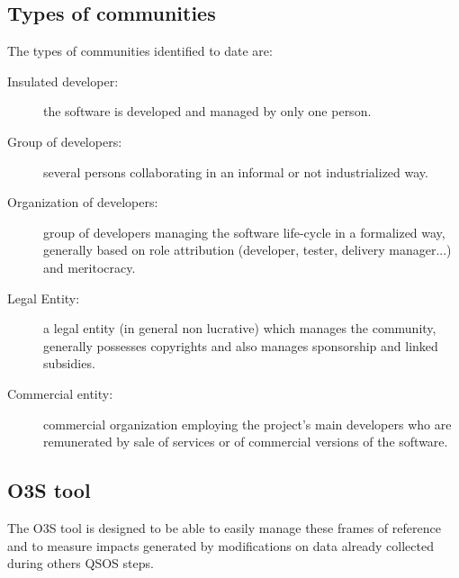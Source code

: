 \subsection{Types of communities}
The types of communities identified to date are:
\begin{description}
\item [Insulated developer:] the software is developed and managed by only one person.
\item [Group of developers:] several persons collaborating in an informal or not industrialized way.
\item [Organization of developers:] group of developers managing the software life-cycle in a formalized way, generally based on role attribution (developer, tester, delivery manager...) and meritocracy.
\item [Legal Entity:] a legal entity (in general non lucrative) which manages the community, generally possesses copyrights and also manages sponsorship and linked subsidies.
\item [Commercial entity:] commercial organization employing the project's main developers who are remunerated by sale of services or of commercial versions of the software.
\end{description}


\subsection{O3S tool}
The O3S tool is designed to be able to easily manage these frames of reference and to measure 
impacts generated by modifications on data already collected during others QSOS steps.
